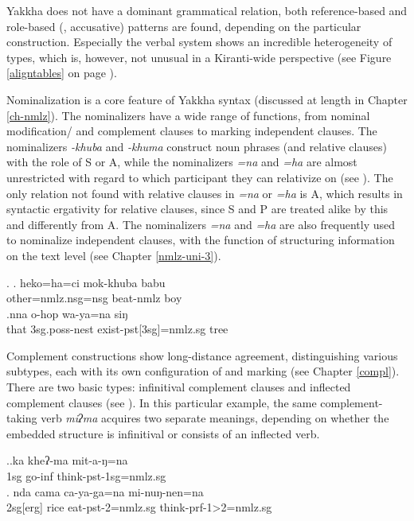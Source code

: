 Yakkha does not have a dominant grammatical relation, both reference-based and role-based (, accusative)  patterns are found, depending on the particular construction. Especially the verbal  system shows an incredible heterogeneity of  types, which is, however, not unusual in a Kiranti-wide perspective (see Figure \ref{aligntables} on page \pageref{aligntables}). 

Nominalization is a core feature of Yakkha syntax (discussed at length in Chapter \ref{ch-nmlz}). The nominalizers have a wide range of functions, from nominal modification/ and complement clauses to marking independent clauses. The nominalizers \emph{-khuba} and \emph{-khuma} construct noun phrases (and relative clauses) with the role of S or A, while the nominalizers \emph{=na} and \emph{=ha} are almost unrestricted with regard to which participant they can relativize on (see \Next). The only relation not found with relative clauses in \emph{=na} or \emph{=ha} is A, which results in syntactic ergativity for relative clauses, since S and P are treated alike by this  and differently from A.
The nominalizers \emph{=na} and \emph{=ha} are also frequently used to nominalize independent clauses, with the function of structuring information  on the text level (see Chapter \ref{nmlz-uni-3}). 

\ex. \ag.   heko=ha=ci mok-khuba babu\\
			other{\sc =nmlz.nsg=nsg} beat{\sc -nmlz} boy\\
\bg.nna  o-hop wa-ya=na siŋ\\
		that {\sc 3sg.poss}-nest exist-{\sc pst[3sg]=nmlz.sg} tree\\
	

Complement constructions show long-distance agreement, distinguishing various subtypes, each with its own configuration of  and  marking (see Chapter \ref{compl}). There are two basic types: infinitival complement clauses and inflected complement clauses (see \Next). In this particular example, the same complement-taking verb \emph{miʔma} acquires two separate meanings, depending on whether the embedded structure is infinitival or consists of an inflected verb.

\ex.\ag.ka kheʔ-ma mit-a-ŋ=na\\
{\sc 1sg} go{\sc -inf} think{\sc -pst-1sg=nmlz.sg}\\
\bg. nda cama ca-ya-ga=na mi-nuŋ-nen=na\\
{\sc 2sg[erg]} rice eat-{\sc pst-2=nmlz.sg} think-{\sc prf-1>2=nmlz.sg}\\


